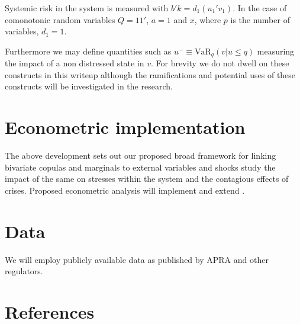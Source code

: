 \documentclass[authoryear]{elsarticle}
\newcommand{\var}{\ensuremath{\mathrm{VaR}}}
\begin{document}
Systemic risk in the system is measured with $b'k=d_1(u_1'v_1)$.   In the case of comonotonic  random variables $Q=11'$, $a=1$ and $x$, where $p$ is the number of variables,  $d_1=1$. 
 
Furthermore we may define quantities such as
$
u^- \equiv \var_q(v|u\le q)
$
measuring the impact of a non distressed state in $v$.  For brevity we do not dwell on these constructs in this writeup although the ramifications and potential uses of these constructs will be  investigated in the research.



\section{Econometric implementation}

The above development sets out our proposed  broad  framework for linking bivariate copulas and marginals to external variables and shocks study the impact of the same on stresses within the system and the contagious effects of crises.   Proposed econometric analysis will implement and extend  \cite{brownlees2010volatility}.

\section{Data}

We will employ publicly available data as published by APRA and other regulators.

\section*{References}

\end{document}
